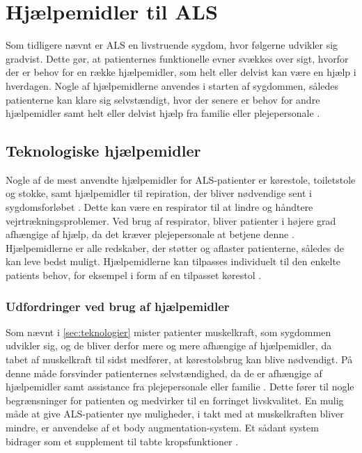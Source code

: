 \section{Hjælpemidler til ALS} \label{sec:teknologier}
Som tidligere nævnt er ALS en livstruende sygdom, hvor følgerne udvikler sig gradvist. Dette gør, at patienternes funktionelle evner svækkes over sigt, hvorfor der er behov for en række hjælpemidler, som helt eller delvist kan være en hjælp i hverdagen. Nogle af hjælpemidlerne anvendes i starten af sygdommen, således patienterne kan klare sig selvstændigt, hvor der senere er behov for andre hjælpemidler samt helt eller delvist hjælp fra familie eller plejepersonale \citep{brandt2010}.

\subsection{Teknologiske hjælpemidler}
Nogle af de mest anvendte hjælpemidler for ALS-patienter er kørestole, toiletstole og stokke, \citep{brandt2010} samt hjælpemidler til repiration, der bliver nødvendige sent i sygdomsforløbet \citep{hefferman2006}. Dette kan være en respirator til at lindre og håndtere vejrtrækningsproblemer. Ved brug af respirator, bliver patienter i højere grad afhængige af hjælp, da det kræver plejepersonale at betjene denne  \citep{rcfm2001}.  Hjælpemidlerne er alle redskaber, der støtter og aflaster patienterne, således de kan leve bedst muligt. Hjælpemidlerne kan tilpasses individuelt til den enkelte patients behov, for eksempel i form af en tilpasset kørestol \citep{brandt2010}.

\subsubsection{Udfordringer ved brug af hjælpemidler}
Som nævnt i \autoref{sec:teknologier} mister patienter muskelkraft, som sygdommen udvikler sig, og de bliver derfor mere og mere afhængige af hjælpemidler, da tabet af muskelkraft til sidst medfører, at kørestolsbrug kan blive nødvendigt. På denne måde forsvinder patienternes selvstændighed, da de er afhængige af hjælpemidler samt assistance fra plejepersonale eller familie \citep{brandt2010}. Dette fører til nogle begrænsninger for patienten og medvirker til en forringet livskvalitet. En mulig måde at give ALS-patienter nye muligheder, i takt med at muskelkraften bliver mindre, er anvendelse af et body augmentation-system. Et sådant system bidrager som et supplement til tabte kropsfunktioner \citep{erlen2003}.

